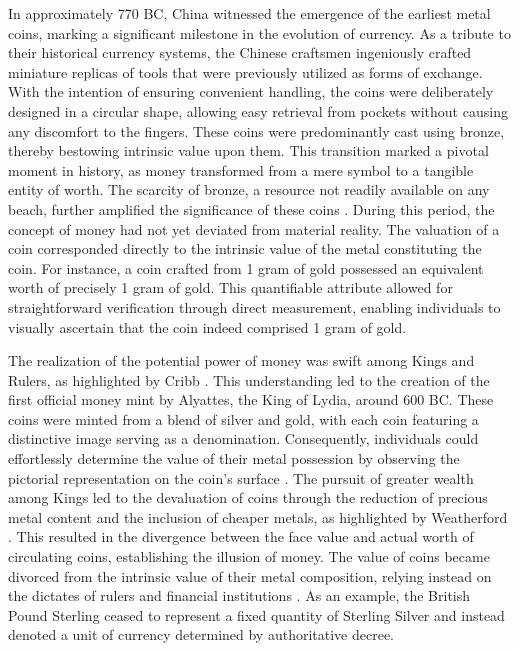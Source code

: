 In approximately 770 BC, China witnessed the emergence of the earliest metal coins, marking a significant milestone in the evolution of currency.
As a tribute to their historical currency systems, the Chinese craftsmen ingeniously crafted miniature replicas of tools that were previously
utilized as forms of exchange. With the intention of ensuring convenient handling, the coins were deliberately designed in a circular shape,
allowing easy retrieval from pockets without causing any discomfort to the fingers. These coins were predominantly cast using bronze, thereby
bestowing intrinsic value upon them. This transition marked a pivotal moment in history, as money transformed from a mere symbol to a tangible
entity of worth. The scarcity of bronze, a resource not readily available on any beach, further amplified the significance of these coins
\cite{li2003, hartill2005}. During this period, the concept of money had not yet deviated from material reality. The valuation of a coin
corresponded directly to the intrinsic value of the metal constituting the coin. For instance, a coin crafted from 1 gram of gold possessed
an equivalent worth of precisely 1 gram of gold. This quantifiable attribute allowed for straightforward verification through direct measurement,
enabling individuals to visually ascertain that the coin indeed comprised 1 gram of gold.

The realization of the potential power of money was swift among Kings and Rulers, as highlighted by Cribb \cite{cribb1991}. This understanding
led to the creation of the first official money mint by Alyattes, the King of Lydia, around 600 BC. These coins were minted from a blend of
silver and gold, with each coin featuring a distinctive image serving as a denomination. Consequently, individuals could effortlessly determine
the value of their metal possession by observing the pictorial representation on the coin's surface \cite{deVries2008}. The pursuit of greater
wealth among Kings led to the devaluation of coins through the reduction of precious metal content and the inclusion of cheaper metals, as
highlighted by Weatherford \cite{weatherford1997}. This resulted in the divergence between the face value and actual worth of circulating coins,
establishing the illusion of money. The value of coins became divorced from the intrinsic value of their metal composition, relying instead on
the dictates of rulers and financial institutions \cite{ferguson2009}. As an example, the British Pound Sterling ceased to represent a fixed
quantity of Sterling Silver and instead denoted a unit of currency determined by authoritative decree.

